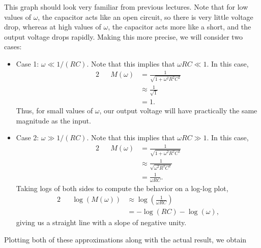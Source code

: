 \documentclass[letterpaper]{article}
\theoremstyle{remark}
\DeclarePairedDelimiter\abs{\lvert}{\rvert}%
\newcommand{\eqn}[1]{\begin{alignat*}{2}#1\end{alignat*}}
\begin{document}
This graph should look very familiar from previous lectures. Note that for low values of $\omega$, the capacitor acts like an open circuit, so there is very little voltage drop, whereas at high values of $\omega$, the capacitor acts more like a short, and the output voltage drops rapidly. Making this more precise, we will consider two cases:
\begin{itemize}
    \item Case 1: $\omega \ll 1 / (RC)$. Note that this implies that $\omega RC \ll 1$. In this case,
    \eqn{
        && M(\omega) &= \frac{1}{\sqrt{1 + \omega^2R^2C^2}} \\
        &&&\approx \frac{1}{\sqrt{1}} \\
        &&&= 1.
    }
    Thus, for small values of $\omega$, our output voltage will have practically the same magnitude as the input.
    \item Case 2: $\omega \gg 1 / (RC)$. Note that this implies that $\omega RC \gg 1$. In this case,
    \eqn{
        && M(\omega) &= \frac{1}{\sqrt{1 + \omega^2R^2C^2}} \\
        &&&\approx \frac{1}{\sqrt{\omega^2R^2C^2}} \\
        &&&= \frac{1}{\omega R C}.
    }
    Taking logs of both sides to compute the behavior on a log-log plot,
    \eqn{
        && \log{(M(\omega))} &\approx \log{\left(\frac{1}{\omega RC}\right)} \\
        &&&= -\log{(RC)} - \log{(\omega)},
    }
    giving us a straight line with a slope of negative unity.
\end{itemize}
Plotting both of these approximations along with the actual result, we obtain
\begin{center}
\end{center}
\end{document}
